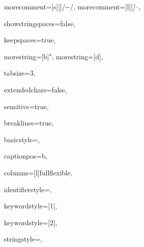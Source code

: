 {%
morecomment=[s][\color{commentcolor}]{/-}{-/},
morecomment=[l][\itshape \color{commentcolor}]{--},

showstringspaces=false,

keepspaces=true,

morestring=[b]",
morestring=[d],

tabsize=3,

extendedchars=false,

sensitive=true,

breaklines=true,

basicstyle=\ttfamily,

captionpos=b,

columns=[l]fullflexible,


identifierstyle={\ttfamily\color{black}},

keywordstyle=[1]{\ttfamily\color{keywordcolor}},

keywordstyle=[2]{\ttfamily\color{sortcolor}},



stringstyle=\ttfamily,


}